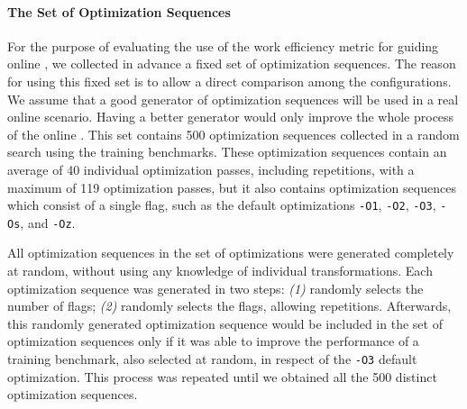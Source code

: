 \paragraph{The Set of Optimization Sequences}
For the purpose of evaluating the use of the work efficiency metric for guiding
online {\itercomp}, we collected in advance a fixed set of optimization sequences.
The reason for using this fixed set is to allow a direct comparison among the configurations.
We assume that a good generator of optimization sequences will be used in a real online scenario.
Having a better generator would only improve the whole process of the online {\itercomp}.
This set contains 500 optimization sequences collected in a random search using the training benchmarks.
These optimization sequences contain an average of 40 individual optimization passes,
including repetitions, with a maximum of 119 optimization passes, but it also contains
optimization sequences which consist of a single flag, such as the default optimizations
\texttt{-O1}, \texttt{-O2}, \texttt{-O3}, \texttt{-Os}, and \texttt{-Oz}.

All optimization sequences in the set of optimizations were generated completely
at random, without using any knowledge of individual transformations.
Each optimization sequence was generated in two steps: \textit{(1)} randomly
selects the number of flags; \textit{(2)} randomly selects the flags, allowing repetitions.
Afterwards, this randomly generated optimization sequence would be included in
the set of optimization sequences only if it was able to improve the performance
of a training benchmark, also selected at random, in respect of the \texttt{-O3}
default optimization.
This process was repeated until we obtained all the 500 distinct optimization sequences.


